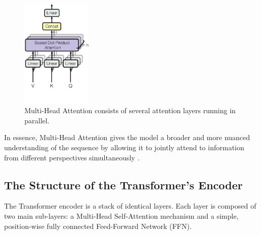 \begin{figure}[htb]
\centering
\includegraphics[width=0.3\textwidth]{logos/Multi-head.png}
\caption[Multi-Head Attention mechanism]{Multi-Head Attention consists of several attention layers running in parallel.\cite{vaswani2017attention}}
\label{fig:multi_head_attention}
\end{figure}

In essence, Multi-Head Attention gives the model a broader and more nuanced understanding of the sequence by allowing it to jointly attend to information from different perspectives simultaneously \cite{vaswani2017attention}.

\subsection{The Structure of the Transformer's Encoder}
The Transformer encoder is a stack of identical layers. Each layer is composed of two main sub-layers: a Multi-Head Self-Attention mechanism and a simple, position-wise fully connected Feed-Forward Network (FFN).

